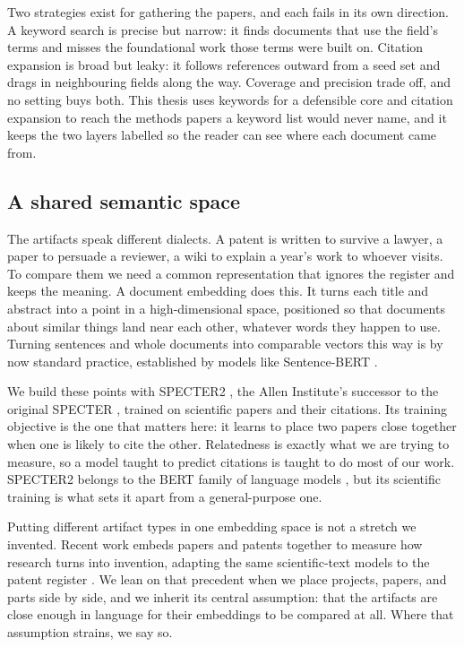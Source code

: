 \documentclass[12pt,a4paper]{article}
\begin{document}
	Two strategies exist for gathering the papers, and each fails in its own
	direction. A keyword search is precise but narrow: it finds documents that use the
	field's terms and misses the foundational work those terms were built on. Citation
	expansion is broad but leaky: it follows references outward from a seed set and
	drags in neighbouring fields along the way. Coverage and precision trade off, and
	no setting buys both. This thesis uses keywords for a defensible core and citation
	expansion to reach the methods papers a keyword list would never name, and it
	keeps the two layers labelled so the reader can see where each document came from.
	
	\subsection{A shared semantic space}
	
	The artifacts speak different dialects. A patent is written to survive a lawyer, a
	paper to persuade a reviewer, a wiki to explain a year's work to whoever visits.
	To compare them we need a common representation that ignores the register and
	keeps the meaning. A document embedding does this. It turns each title and
	abstract into a point in a high-dimensional space, positioned so that documents
	about similar things land near each other, whatever words they happen to use.
	Turning sentences and whole documents into comparable vectors this way is by now
	standard practice, established by models like Sentence-BERT
	\citep{reimersSentenceBERT2019}.
	
	We build these points with SPECTER2 \citep{singhSciRepEvalMultiFormat2023}, the
	Allen Institute's successor to the original SPECTER
	\citep{cohanDocumentlevelRepresentation2020}, trained on scientific papers and
	their citations. Its training objective is the one
	that matters here: it learns to place two papers close together when one is likely
	to cite the other. Relatedness is exactly what we are trying to measure, so a
	model taught to predict citations is taught to do most of our work. SPECTER2
	belongs to the BERT family of language models
	\citep{devlinBERTPretrainingDeep2019}, but its scientific training is what sets it
	apart from a general-purpose one.
	
	Putting different artifact types in one embedding space is not a stretch we
	invented. Recent work embeds papers and patents together to measure how research
	turns into invention, adapting the same scientific-text models to the patent
	register \citep{bekamiriPatentSBERTa2024}. We lean on that
	precedent when we place projects, papers, and parts side by side, and we inherit
	its central assumption: that the artifacts are close enough in language for their
	embeddings to be compared at all. Where that assumption strains, we say so.
	
\end{document}
